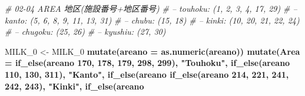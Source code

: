 \documentclass[]{article}
\newenvironment{Shaded}{\begin{snugshade}}{\end{snugshade}}
\newcommand{\CommentTok}[1]{\textcolor[rgb]{0.56,0.35,0.01}{\textit{#1}}}
\newcommand{\DataTypeTok}[1]{\textcolor[rgb]{0.13,0.29,0.53}{#1}}
\newcommand{\DecValTok}[1]{\textcolor[rgb]{0.00,0.00,0.81}{#1}}
\newcommand{\KeywordTok}[1]{\textcolor[rgb]{0.13,0.29,0.53}{\textbf{#1}}}
\newcommand{\NormalTok}[1]{#1}
\newcommand{\OperatorTok}[1]{\textcolor[rgb]{0.81,0.36,0.00}{\textbf{#1}}}
\newcommand{\StringTok}[1]{\textcolor[rgb]{0.31,0.60,0.02}{#1}}
\begin{document}
\begin{Shaded}
\begin{Highlighting}[]
\CommentTok{# 02-04 AREA 地区(施設番号+地区番号)}
\CommentTok{# – touhoku: (1, 2, 3, 4, 17, 29)}
\CommentTok{# – kanto: (5, 6, 8, 9, 11, 13, 31)}
\CommentTok{# – chubu: (15, 18)}
\CommentTok{# – kinki: (10, 20, 21, 22, 24)}
\CommentTok{# – chugoku: (25, 26)}
\CommentTok{# – kyushiu: (27, 30)}

\NormalTok{MILK_}\DecValTok{0}\NormalTok{ <-}\StringTok{ }\NormalTok{MILK_}\DecValTok{0} \OperatorTok{%
\StringTok{  }\KeywordTok{mutate}\NormalTok{(}\DataTypeTok{areano =} \KeywordTok{as.numeric}\NormalTok{(areano)) }\OperatorTok{%
\StringTok{  }\KeywordTok{mutate}\NormalTok{(}\DataTypeTok{Area =} \KeywordTok{if_else}\NormalTok{(areano }\OperatorTok{%
                                      \DecValTok{170}\NormalTok{, }\DecValTok{178}\NormalTok{, }\DecValTok{179}\NormalTok{, }\DecValTok{298}\NormalTok{, }\DecValTok{299}\NormalTok{), }\StringTok{"Touhoku"}\NormalTok{, }
                  \KeywordTok{if_else}\NormalTok{(areano }\OperatorTok{%
                                          \DecValTok{110}\NormalTok{, }\DecValTok{130}\NormalTok{, }\DecValTok{311}\NormalTok{), }\StringTok{"Kanto"}\NormalTok{, }
                    \KeywordTok{if_else}\NormalTok{(areano }\OperatorTok{%
                      \KeywordTok{if_else}\NormalTok{(areano }\OperatorTok{%
                                \DecValTok{214}\NormalTok{, }\DecValTok{221}\NormalTok{, }\DecValTok{241}\NormalTok{, }\DecValTok{242}\NormalTok{, }\DecValTok{243}\NormalTok{), }\StringTok{"Kinki"}\NormalTok{, }
                        \KeywordTok{if_else}\NormalTok{(areano }\OperatorTok{%
}}}}}}}
\end{Highlighting}
\end{Shaded}
\end{document}
